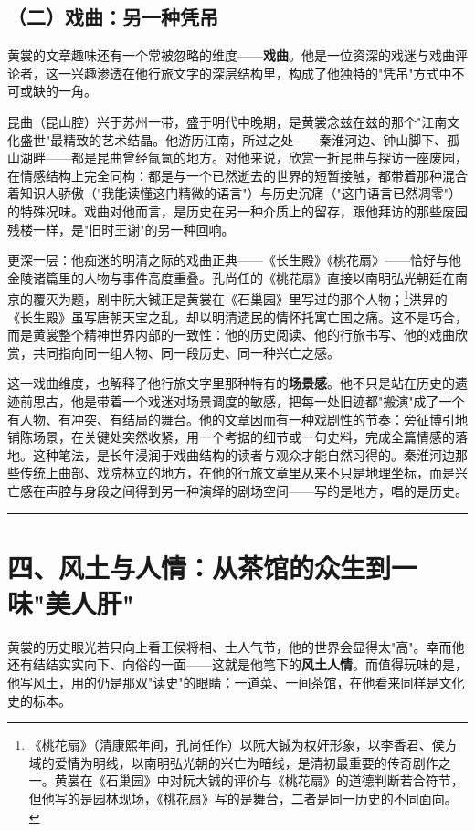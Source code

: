 \documentclass[UTF8,fontset=none,zihao=-4,a4paper]{ctexart}
\newcommand{\fb}{\CJKfamily{zhfb}}
\begin{document}
\subsection{（二）戏曲：另一种凭吊}


黄裳的文章趣味还有一个常被忽略的维度——\textbf{戏曲}。他是一位资深的戏迷与戏曲评论者，这一兴趣渗透在他行旅文字的深层结构里，构成了他独特的"凭吊"方式中不可或缺的一角。


昆曲（昆山腔）兴于苏州一带，盛于明代中晚期，是黄裳念兹在兹的那个"江南文化盛世"最精致的艺术结晶。他游历江南，所过之处——秦淮河边、钟山脚下、孤山湖畔——都是昆曲曾经氤氲的地方。对他来说，欣赏一折昆曲与探访一座废园，在情感结构上完全同构：都是与一个已然逝去的世界的短暂接触，都带着那种混合着知识人骄傲（"我能读懂这门精微的语言"）与历史沉痛（"这门语言已然凋零"）的特殊况味。戏曲对他而言，是历史在另一种介质上的留存，跟他拜访的那些废园残楼一样，是"旧时王谢"的另一种回响。


更深一层：他痴迷的明清之际的戏曲正典——《长生殿》《桃花扇》——恰好与他金陵诸篇里的人物与事件高度重叠。孔尚任的《桃花扇》直接以南明弘光朝廷在南京的覆灭为题，剧中阮大铖正是黄裳在《石巢园》里写过的那个人物；\footnote{《桃花扇》（清康熙年间，孔尚任作）以阮大铖为权奸形象，以李香君、侯方域的爱情为明线，以南明弘光朝的兴亡为暗线，是清初最重要的传奇剧作之一。黄裳在《石巢园》中对阮大铖的评价与《桃花扇》的道德判断若合符节，但他写的是园林现场，《桃花扇》写的是舞台，二者是同一历史的不同面向。}洪{\fb 昇}的《长生殿》虽写唐朝天宝之乱，却以明清遗民的情怀托寓亡国之痛。这不是巧合，而是黄裳整个精神世界内部的一致性：他的历史阅读、他的行旅书写、他的戏曲欣赏，共同指向同一组人物、同一段历史、同一种兴亡之感。


这一戏曲维度，也解释了他行旅文字里那种特有的\textbf{场景感}。他不只是站在历史的遗迹前思古，他是带着一个戏迷对场景调度的敏感，把每一处旧迹都"搬演"成了一个有人物、有冲突、有结局的舞台。他的文章因而有一种戏剧性的节奏：旁征博引地铺陈场景，在关键处突然收紧，用一个考据的细节或一句史料，完成全篇情感的落地。这种笔法，是长年浸润于戏曲结构的读者与观众才能自然习得的。秦淮河边那些传统上曲部、戏院林立的地方，在他的行旅文章里从来不只是地理坐标，而是兴亡感在声腔与身段之间得到另一种演绎的剧场空间——写的是地方，唱的是历史。


\medskip\hrule\medskip

\section{四、风土与人情：从茶馆的众生到一味"美人肝"}


黄裳的历史眼光若只向上看王侯将相、士人气节，他的世界会显得太"高"。幸而他还有结结实实向下、向俗的一面——这就是他笔下的\textbf{风土人情}。而值得玩味的是，他写风土，用的仍是那双"读史"的眼睛：一道菜、一间茶馆，在他看来同样是文化史的标本。
\end{document}
